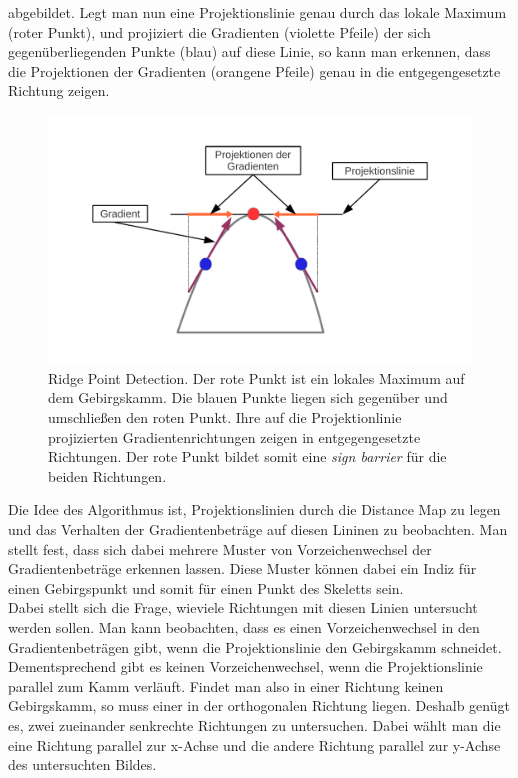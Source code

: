 abgebildet. Legt man nun eine Projektionslinie genau durch das lokale Maximum (roter Punkt), und projiziert die Gradienten (violette Pfeile) der sich gegenüberliegenden Punkte (blau) auf diese Linie, so kann man erkennen, dass die Projektionen der Gradienten (orangene Pfeile) genau in die entgegengesetzte Richtung zeigen.
\begin{figure}[ht]
\centering
\includegraphics[width=1.0\linewidth]{./fig/paper_ridge_point_detection.pdf}
\caption{Ridge Point Detection. Der rote Punkt ist ein lokales Maximum auf dem Gebirgskamm. Die blauen Punkte liegen sich
gegenüber und umschließen den roten Punkt. Ihre auf die Projektionlinie projizierten Gradientenrichtungen zeigen in entgegengesetzte Richtungen. Der rote Punkt bildet somit eine \emph{sign barrier} für die beiden Richtungen.}
\label{fig:paper_ridge_point_detection}
\end{figure}
\FloatBarrier
\noindent
Die Idee des Algorithmus ist, Projektionslinien durch die Distance Map zu legen und das Verhalten der Gradientenbeträge
auf diesen Lininen zu beobachten. Man stellt fest, dass sich dabei mehrere Muster von Vorzeichenwechsel der
Gradientenbeträge erkennen lassen. Diese Muster können dabei ein Indiz für einen Gebirgspunkt und somit für einen Punkt des Skeletts sein. \\
Dabei stellt sich die Frage, wieviele Richtungen mit diesen Linien untersucht werden sollen. Man kann beobachten, dass es
einen Vorzeichenwechsel in den Gradientenbeträgen gibt, wenn die Projektionslinie den Gebirgskamm schneidet. Dementsprechend 
gibt es keinen Vorzeichenwechsel, wenn die Projektionslinie parallel zum Kamm verläuft. Findet man also in einer Richtung
keinen Gebirgskamm, so muss einer in der orthogonalen Richtung liegen. Deshalb genügt es, zwei zueinander senkrechte Richtungen
zu untersuchen. Dabei wählt man die eine Richtung parallel zur x-Achse und die andere Richtung parallel zur y-Achse des untersuchten Bildes.
